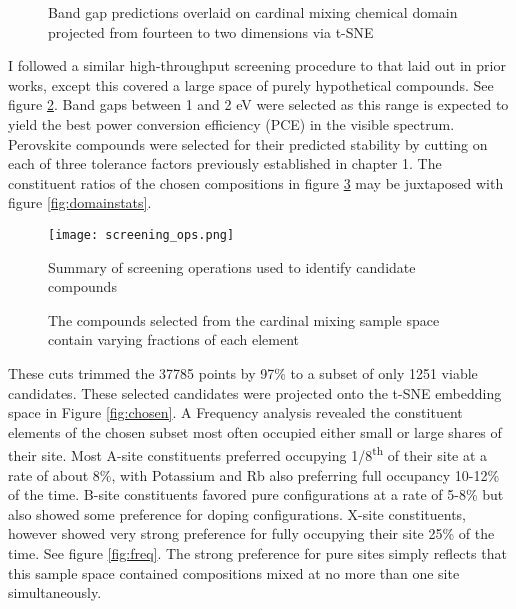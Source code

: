  
\begin{figure}[htbp]
\centering

\caption{\label{fig:pred} Band gap predictions overlaid on cardinal mixing chemical domain projected from fourteen to two dimensions via t-SNE}
\end{figure}

I followed a similar high-throughput screening procedure to that laid out in prior works, except this covered a large space of purely hypothetical compounds.
\autocite{yang-2023-high-throug,mannodi-kanakkithodi-2021-comput-data}
See figure \ref{fig:screenops}.
Band gaps between 1 and 2 \unit{\electronvolt} were selected as this range is expected to yield the best power conversion efficiency (PCE) in the visible spectrum.
\autocite{yu-2012-ident-poten,shockley-1961-detail-balan}
Perovskite compounds were selected for their predicted stability by cutting on each of three tolerance factors previously established in chapter 1.
The constituent ratios of the chosen compositions in figure \ref{fig:chosenstats} may be juxtaposed with figure \ref{fig:domainstats}.

\begin{figure}[htbp]
\centering
\texttt{[image: screening\_ops.png]}
\caption{\label{fig:screenops} Summary of screening operations used to identify candidate compounds}
\end{figure}

 
\begin{figure}[htbp]
\centering

\caption{\label{fig:chosenstats} The compounds selected from the cardinal mixing sample space contain varying fractions of each element}
\end{figure}

These cuts trimmed the 37785 points by 97\% to a subset of only 1251 viable candidates.
These selected candidates were projected onto the t-SNE embedding space in Figure \ref{fig:chosen}.
A Frequency analysis revealed the constituent elements of the chosen subset most often occupied either small or large shares of their site.
Most A-site constituents preferred occupying 1/8\textsuperscript{th} of their site at a rate of about 8\%, with Potassium and Rb also preferring full occupancy 10-12\% of the time.
B-site constituents favored pure configurations at a rate of 5-8\% but also showed some preference for doping configurations.
X-site constituents, however showed very strong preference for fully occupying their site 25\% of the time.
See figure \ref{fig:freq}.
The strong preference for pure sites simply reflects that this sample space contained compositions mixed at no more than one site simultaneously.

